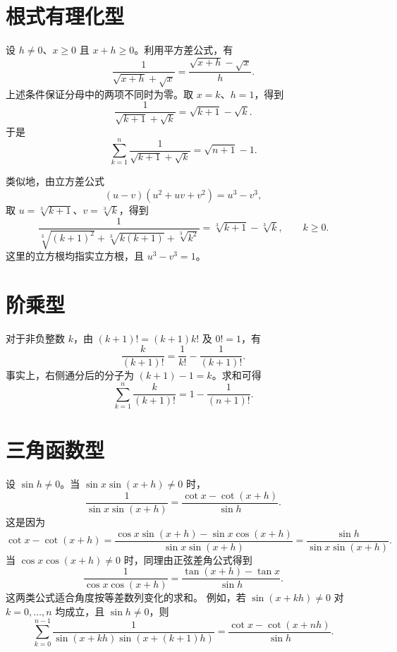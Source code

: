 \documentclass[UTF8,12pt,a4paper,fontset=fandol]{ctexart}
\begin{document}
\section{根式有理化型}

设 $h\ne0$、$x\ge0$ 且 $x+h\ge0$。利用平方差公式，有
\begin{equation}\label{eq:square-root}
  \boxed{\frac1{\sqrt{x+h}+\sqrt{x}}
  =\frac{\sqrt{x+h}-\sqrt{x}}h}.
\end{equation}
上述条件保证分母中的两项不同时为零。取 $x=k$、$h=1$，得到
\[
  \frac1{\sqrt{k+1}+\sqrt{k}}=\sqrt{k+1}-\sqrt{k}.
\]
于是
\[
  \sum_{k=1}^{n}\frac1{\sqrt{k+1}+\sqrt{k}}
  =\sqrt{n+1}-1.
\]

类似地，由立方差公式
\[
  (u-v)(u^2+uv+v^2)=u^3-v^3,
\]
取 $u=\sqrt[3]{k+1}$、$v=\sqrt[3]{k}$，得到
\begin{equation}\label{eq:cube-root}
  \boxed{
  \frac1{\sqrt[3]{(k+1)^2}+\sqrt[3]{k(k+1)}+\sqrt[3]{k^2}}
  =\sqrt[3]{k+1}-\sqrt[3]{k}},\qquad k\ge0.
\end{equation}
这里的立方根均指实立方根，且 $u^3-v^3=1$。

\section{阶乘型}

对于非负整数 $k$，由 $(k+1)!=(k+1)k!$ 及 $0!=1$，有
\begin{equation}\label{eq:factorial}
  \boxed{\frac{k}{(k+1)!}
  =\frac1{k!}-\frac1{(k+1)!}}.
\end{equation}
事实上，右侧通分后的分子为 $(k+1)-1=k$。求和可得
\[
  \sum_{k=1}^{n}\frac{k}{(k+1)!}
  =1-\frac1{(n+1)!}.
\]

\section{三角函数型}

设 $\sin h\ne0$。当 $\sin x\sin(x+h)\ne0$ 时，
\begin{equation}\label{eq:cotangent}
  \boxed{\frac1{\sin x\sin(x+h)}
  =\frac{\cot x-\cot(x+h)}{\sin h}}.
\end{equation}
这是因为
\[
  \cot x-\cot(x+h)
  =\frac{\cos x\sin(x+h)-\sin x\cos(x+h)}{\sin x\sin(x+h)}
  =\frac{\sin h}{\sin x\sin(x+h)}.
\]
当 $\cos x\cos(x+h)\ne0$ 时，同理由正弦差角公式得到
\begin{equation}\label{eq:tangent}
  \boxed{\frac1{\cos x\cos(x+h)}
  =\frac{\tan(x+h)-\tan x}{\sin h}}.
\end{equation}
这两类公式适合角度按等差数列变化的求和。
例如，若 $\sin(x+kh)\ne0$ 对 $k=0,\ldots,n$ 均成立，且 $\sin h\ne0$，则
\[
  \sum_{k=0}^{n-1}\frac1{\sin(x+kh)\sin(x+(k+1)h)}
  =\frac{\cot x-\cot(x+nh)}{\sin h}.
\]
\end{document}
